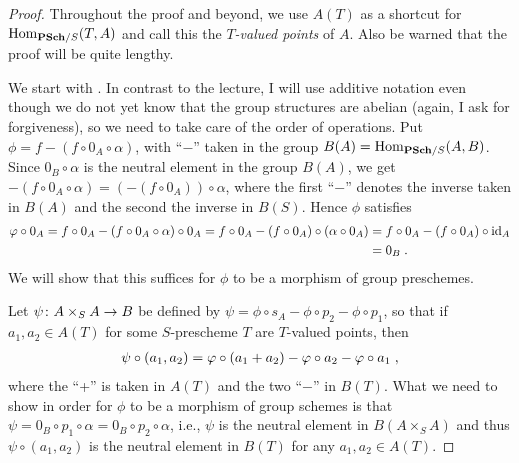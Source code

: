 \documentclass[a4paper,parskip=half,numbers=enddot, DIV=12]{scrreprt}
\begin{document}
\begin{proof}
	Throughout the proof and beyond, we use $A(T)$ as a shortcut for $\Hom_{\cat{PSch}/S}(T,A)$ and call this the \emph{$T$-valued points} of $A$. Also be warned that the proof will be quite lengthy.
	
	We start with . In contrast to the lecture, I will use additive notation even though we do not yet know that the group structures are abelian (again, I ask for forgiveness), so we need to take care of the order of operations. Put $\phi=f-(f\circ0_A\circ\alpha)$, with ``$-$'' taken in the group $B(A)=\Hom_{\cat{PSch}/S}(A,B)$. Since $0_B\circ \alpha$ is the neutral element in the group $B(A)$, we get $-(f\circ 0_A\circ \alpha)=(-(f\circ 0_A))\circ \alpha$, where the first ``$-$'' denotes the inverse taken in $B(A)$ and the second the inverse in $B(S)$. Hence $\phi$ satisfies
	\begin{align*}
		\varphi\circ 0_A=f\circ 0_A-(f\circ 0_A\circ \alpha)\circ 0_A=f\circ 0_A-(f\circ 0_A)\circ (\alpha\circ 0_A)&=f\circ 0_A-(f\circ 0_A)\circ \operatorname{id}_A\\
		&=0_B\;.
	\end{align*}
	We will show that this suffices for $\phi$ to be a morphism of group preschemes.
	
	Let $\psi\colon A\times_SA\morphism B$ be defined by $\psi=\phi\circ s_A-\phi\circ p_2-\phi\circ p_1$, so that if $a_1,a_2\in A(T)$ for some $S$-prescheme $T$ are $T$-valued points, then
	\begin{align}\lbl{eq:psi}
		\psi\circ(a_1,a_2)=\phi\circ(a_1+a_2)-\phi\circ a_2-\phi\circ a_1\;, 
	\end{align}
	where the ``+'' is taken in $A(T)$ and the two ``$-$'' in $B(T)$. What we need to show in order for $\phi$ to be a morphism of group schemes is that $\psi=0_B\circ p_1\circ\alpha=0_B\circ p_2\circ\alpha$, i.e., $\psi$ is the neutral element in $B(A\times_SA)$ and thus $\psi\circ(a_1,a_2)$ is the neutral element in $B(T)$ for any $a_1,a_2\in A(T)$.
	

\end{proof}
\end{document}
